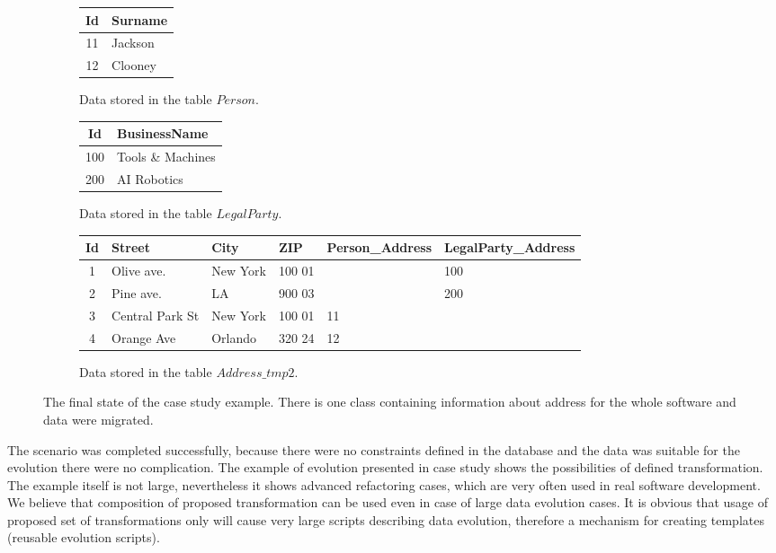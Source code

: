 \documentclass[11pt]{article}
\begin{document}
\begin{figure}
\begin{subfigure}[b]{0.5\textwidth}
	\centering
	\begin{tabular}{| c | l |}
	 	\hline
		Id &  Surname \\ \hline  
		11 & Jackson  \\ \hline
		12 & Clooney  \\ \hline
	\end{tabular}
	\caption{Data stored in the table $Person$.}
\end{subfigure}
\begin{subfigure}[b]{0.5\textwidth}
	\centering
	\begin{tabular}{| c | l |}
	 	\hline
		Id &  BusinessName  \\ \hline  
		100 & Tools \& Machines  \\ \hline
		200 & AI Robotics \\ \hline
	\end{tabular}
	\caption{Data stored in the table $LegalParty$.}
\end{subfigure}
\begin{subfigure}[b]{\textwidth}
	\centering
	\begin{tabular}{| c | l | l | l | l | l |}
	 	\hline
		Id & Street & City & ZIP & Person\_Address & LegalParty\_Address\\ \hline  
		1 & Olive ave. & New York & 100 01 & & 100 \\ \hline
		2 & Pine ave. & LA & 900 03 & & 200  \\ \hline
		3 & Central Park St & New York & 100 01 & 11 &  \\ \hline
		4 & Orange Ave & Orlando & 320 24 & 12 &\\ \hline
	\end{tabular}
	\caption{Data stored in the table $Address\_tmp2$.}
\end{subfigure}

	\caption{The final state of the case study example. There is one class containing information about address for the whole software and data were migrated.}
\end{figure}
The scenario was completed successfully, because there were no constraints defined in the database and the data was suitable for the evolution there were no complication. The example of evolution presented in case study shows the possibilities of defined transformation. The example itself is not large, nevertheless it shows advanced refactoring cases, which are very often used in real software development. We believe that composition of proposed transformation can be used even in case of large data evolution cases. It is obvious that usage of proposed set of transformations only will cause very large scripts describing data evolution, therefore a mechanism for creating templates (reusable evolution scripts).
\end{document}
